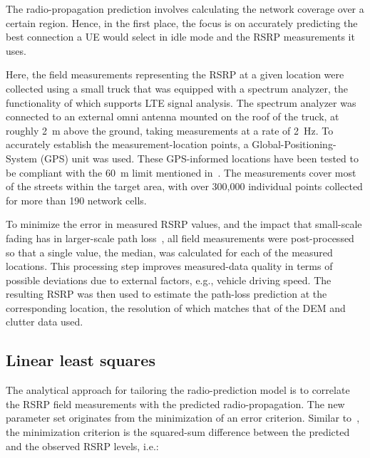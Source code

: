 The radio-propagation prediction involves calculating the network
coverage over a certain region. Hence, in the first place, the focus
is on accurately predicting the best connection a UE would select
in idle mode and the RSRP measurements it uses.

Here, the field measurements representing the RSRP at a given location
were collected using a small truck that was equipped with a spectrum
analyzer, the functionality of which supports LTE signal analysis.
The spectrum analyzer was connected to an external omni antenna mounted
on the roof of the truck, at roughly 2~m above the ground, taking
measurements at a rate of 2~Hz. To accurately establish the measurement-location
points, a Global-Positioning-System (GPS)
unit was used. These GPS-informed locations have been tested to be
compliant with the 60~m limit mentioned in~\cite{Aarnaes-Tuning_of_empirical_radio_propagation_models_effect_of_location_accuracy:2004}.
The measurements cover most of the streets within the target area,
with over 300,000 individual points collected for more than 190 network
cells.

To minimize the error in measured RSRP values, and the impact that
small-scale fading has in larger-scale path loss~\cite{Dortmund-Measurement_based_channel_model_for_large_concert_halls:2010},
all field measurements were post-processed so that a single value,
the median, was calculated for each of the measured locations. This
processing step improves measured-data quality in terms of possible
deviations due to external factors, e.g., vehicle driving speed. The
resulting RSRP was then used to estimate the path-loss prediction
at the corresponding location, the resolution of which matches that
of the DEM and clutter data used.


\subsection{Linear least squares \label{sub:05-Linear_least_squares}}

The analytical approach for tailoring the radio-prediction model is
to correlate the RSRP field measurements with the predicted radio-propagation.
The new parameter set originates from the minimization of an error
criterion. Similar to~\cite{Aarnaes-Tuning_of_empirical_radio_propagation_models_effect_of_location_accuracy:2004,Huang_Online_propagation_model_correction_based_on_PSO_algorithm_in_LTE_SON_system:2012,Yang_A_linear_least_square_method_of_propagation_model_tuning_for_3G_radion_network_planning:2008},
the minimization criterion is the squared-sum difference between the
predicted and the observed RSRP levels, i.e.:

